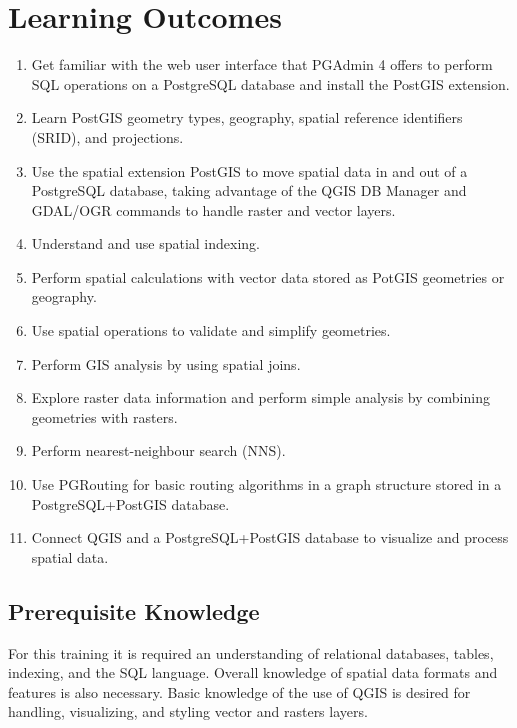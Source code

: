 \documentclass[a4paper,11pt,english]{sphinxmanual}
\begin{document}
\chapter{Learning Outcomes}
\label{\detokenize{instructions:learning-outcomes}}\label{\detokenize{instructions::doc}}\begin{enumerate}
\def\theenumi{\arabic{enumi}}
\def\labelenumi{\theenumi .}
\makeatletter\def\p@enumii{\p@enumi \theenumi .}\makeatother
\item {} 
Get familiar with the web user interface that PGAdmin 4 offers to perform SQL operations on a PostgreSQL database and install the PostGIS extension.

\item {} 
Learn PostGIS geometry types, geography, spatial reference identifiers (SRID), and projections.

\item {} 
Use the spatial extension PostGIS to move spatial data in and out of a PostgreSQL database, taking advantage of the QGIS DB Manager and GDAL/OGR commands to handle raster and vector layers.

\item {} 
Understand and use spatial indexing.

\item {} 
Perform spatial calculations with vector data stored as PotGIS geometries or geography.

\item {} 
Use spatial operations to validate and simplify geometries.

\item {} 
Perform GIS analysis by using spatial joins.

\item {} 
Explore raster data information and perform simple analysis by combining geometries with rasters.

\item {} 
Perform nearest-neighbour search (NNS).

\item {} 
Use PGRouting for basic routing algorithms in a graph structure stored in a PostgreSQL+PostGIS database.

\item {} 
Connect QGIS and a PostgreSQL+PostGIS database to visualize and process spatial data.

\end{enumerate}


\section{Prerequisite Knowledge}
\label{\detokenize{instructions:prerequisite-knowledge}}
For this training it is required an understanding of relational databases, tables, indexing, and the SQL language. Overall knowledge of spatial data formats and features is also necessary.
Basic knowledge of the use of QGIS is desired for handling, visualizing, and styling vector and rasters layers.
\end{document}
